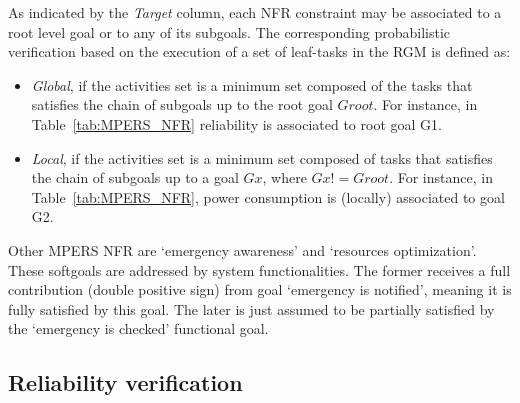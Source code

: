 
As indicated by the \textit{Target} column, each NFR constraint may be associated to a root level goal or to any of its subgoals. The corresponding probabilistic verification based on the execution of a set of leaf-tasks in the RGM is defined as:

\begin{itemize}

\item \textit{Global}, if the activities set is a minimum set composed of the tasks that satisfies the chain of subgoals up to the root goal $Groot$. For instance, in Table~\ref{tab:MPERS_NFR} reliability is associated to root goal G1.
\medskip

\item \textit{Local}, if the activities set is a minimum set composed of tasks that satisfies the chain of subgoals up to a goal $Gx$, where $Gx != Groot$. For instance, in Table~\ref{tab:MPERS_NFR}, power consumption is (locally) associated to goal G2.
\medskip

\end{itemize}


Other MPERS NFR are `emergency awareness' and `resources optimization'. These softgoals are addressed by system functionalities. The former receives a full contribution (double positive sign) from goal `emergency is notified', meaning it is fully satisfied by this goal. The later is just assumed to be partially satisfied by the `emergency is checked' functional goal.

\subsection{Reliability verification}\label{ssec:NFR-verification}


